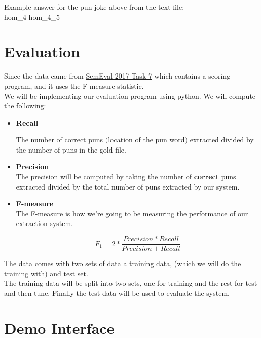 \documentclass{article}
\begin{document}
Example answer for the pun joke above from the text file:\\

hom\_4   hom\_4\_5


\section{Evaluation}\label{sec:evaluation}

Since the data came from \href{http://alt.qcri.org/semeval2017/task7/}{SemEval-2017 Task 7}
which contains a scoring program, and it uses the F-measure statistic.\\

\noindent We will be implementing our evaluation program using python.
We will compute the following:\\


\begin{itemize}

\item [] {\textbf{Recall} }


The number of correct puns $($location of the pun word$)$ extracted divided by the number
of puns in the gold file. \\

\item [] {\textbf{Precision} }\\

The precision will be computed by taking the number of {\textbf{correct} } puns extracted divided
by the total number of puns extracted by our system.

\item [] {\textbf{F-measure} }\\

The F-measure is how we're going to be measuring the performance of our extraction system.

\[F_1 = 2 * \frac{Precision * Recall} {Precision + Recall} \]

\end{itemize}

\noindent The data comes with two sets of data a training data, (which we will do the training with)
and test set. \\

\noindent The training data will be split into two sets, one for training and the rest for test and then tune.
Finally the test data will be used to evaluate the system.



\section{Demo Interface}\label{sec:demoInterface}
\end{document}
